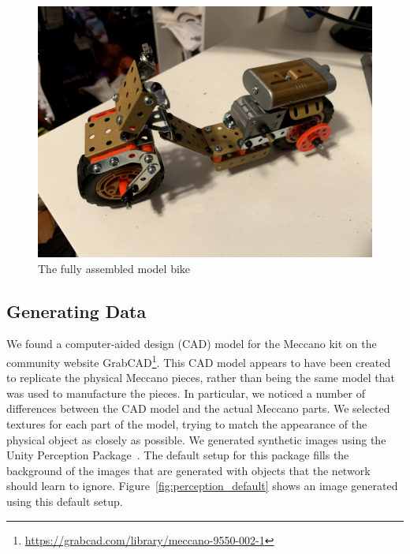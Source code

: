 \begin{figure}
  \includegraphics[width=\columnwidth]{figures/synthetic/full_bike.jpg}
  \caption{
    The fully assembled model bike
  }\label{fig:full_bike}
\end{figure}

\subsection{Generating Data}

We found a computer-aided design (CAD) model for the Meccano kit on the
community website
GrabCAD\footnote{\url{https://grabcad.com/library/meccano-9550-002-1}}.
This CAD model appears to have been created to replicate the physical Meccano
pieces, rather than being the same model that was used to manufacture the
pieces.
In particular, we noticed a number of differences between the CAD model and the
actual Meccano parts.
We selected textures for each part of the model, trying to match the
appearance of the physical object as closely as possible.
We generated synthetic images using the Unity Perception Package~\cite{unity}.
The default setup for this package fills the background of the images that are
generated with objects that the network should learn to ignore.
Figure~\ref{fig:perception_default} shows an image generated using this default
setup.


